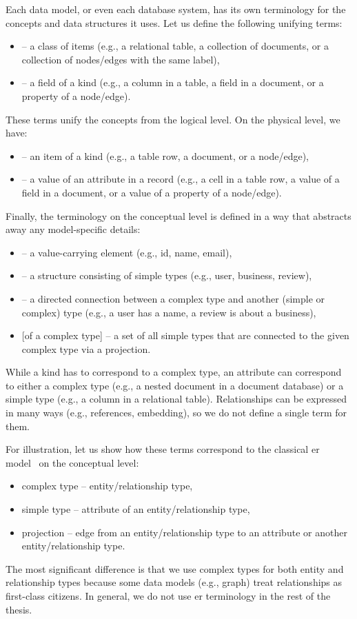 Each data model, or even each database system, has its own terminology for the concepts and data structures it uses. Let us define the following unifying terms:
\begin{itemize}
    \item {} -- a class of items (e.g., a relational table, a collection of documents, or a collection of nodes/edges with the same label),
    \item {} -- a field of a kind (e.g., a column in a table, a field in a document, or a property of a node/edge).
\end{itemize}
These terms unify the concepts from the logical level. On the physical level, we have:
\begin{itemize}
    \item {} -- an item of a kind (e.g., a table row, a document, or a node/edge),
    \item {} -- a value of an attribute in a record (e.g., a cell in a table row, a value of a field in a document, or a value of a property of a node/edge).
\end{itemize}
Finally, the terminology on the conceptual level is defined in a way that abstracts away any model-specific details:
\begin{itemize}
    \item {} -- a value-carrying element (e.g., id, name, email),
    \item {} -- a structure consisting of simple types (e.g., user, business, review),
    \item {} -- a directed connection between a complex type and another (simple or complex) type (e.g., a user has a name, a review is about a business),
    \item {} {[}of a complex type{]} -- a set of all simple types that are connected to the given complex type via a projection.
\end{itemize}

While a kind has to correspond to a complex type, an attribute can correspond to either a complex type (e.g., a nested document in a document database) or a simple type (e.g., a column in a relational table). Relationships can be expressed in many ways (e.g., references, embedding), so we do not define a single term for them.

For illustration, let us show how these terms correspond to the classical \acrshort{er} model~\citep{ER} on the conceptual level:
\begin{itemize}
    \item complex type -- entity/relationship type,
    \item simple type -- attribute of an entity/relationship type,
    \item projection -- edge from an entity/relationship type to an attribute or another entity/relationship type.
\end{itemize}
The most significant difference is that we use complex types for both entity and relationship types because some data models (e.g., graph) treat relationships as first-class citizens. In general, we do not use \acrshort{er} terminology in the rest of the thesis.

